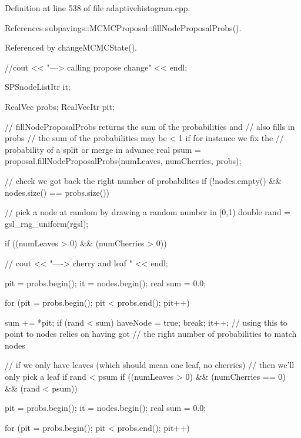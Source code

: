 \-Definition at line 538 of file adaptivehistogram.\-cpp.



\-References subpavings\-::\-M\-C\-M\-C\-Proposal\-::fill\-Node\-Proposal\-Probs().



\-Referenced by change\-M\-C\-M\-C\-State().


\begin{DoxyCode}
{
    //cout << "---> calling propose change" << endl;
    
    SPSnodeListItr it;

    RealVec probs;
    RealVecItr pit;

    // fillNodeProposalProbs returns the sum of the probabilities and
    // also fills in probs
    // the sum of the probabilities may be < 1 if for instance we fix the
    // probability of a split or merge in advance
    real psum = proposal.fillNodeProposalProbs(numLeaves, numCherries, probs);

    // check we got back the right number of probabilites
    if (!nodes.empty() && nodes.size() == probs.size()) {

        // pick a node at random  by drawing a random number in [0,1)
        double rand = gsl_rng_uniform(rgsl);
       
        if ((numLeaves > 0) && (numCherries > 0)) {
            
          //  cout << "----> cherry and leaf " << endl;
            
            pit = probs.begin();
            it = nodes.begin();
            real sum = 0.0;

            for (pit = probs.begin(); pit < probs.end(); pit++) {

                    sum += *pit;
                    if (rand < sum) {
                        haveNode = true;
                        break;
                    }
                    it++; // using this to point to nodes relies on having got
                            // the right number of probabilities to match nodes
             }
        }
        // if we only have leaves (which should mean one leaf, no cherries)
        // then we'll only pick a leaf if rand < psum
        if ((numLeaves > 0) && (numCherries == 0) && (rand < psum)) {
            
            
            pit = probs.begin();
            it = nodes.begin();
            real sum = 0.0;

            for (pit = probs.begin(); pit < probs.end(); pit++) {
                    
}}}}
\end{DoxyCode}
